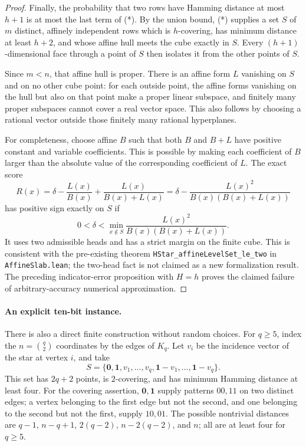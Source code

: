 \documentclass[11pt]{article}
\begin{document}
\begin{proof}
Finally, the probability that two rows have Hamming distance at
most $h+1$ is at most the last term of (*). By the union bound,
(*) supplies a set $S$ of $m$ distinct, affinely independent rows
which is $h$-covering, has minimum distance at least $h+2$, and
whose affine hull meets the cube exactly in $S$.
Every $(h+1)$-dimensional face through a point of $S$ then isolates
it from the other points of $S$.

Since $m<n$, that affine hull is proper. There is an affine form
$L$ vanishing on $S$ and on no other cube point: for each outside
point, the affine forms vanishing on the hull but also on that point
make a proper linear subspace, and finitely many proper subspaces
cannot cover a real vector space. This also follows by choosing a
rational vector outside those finitely many rational hyperplanes.

For completeness, choose affine $B$ such that both $B$ and $B+L$
have positive constant and variable coefficients. This is possible
by making each coefficient of $B$ larger than the absolute value
of the corresponding coefficient of $L$. The exact score
\[
 R(x)=\delta-\frac{L(x)}{B(x)}+\frac{L(x)}{B(x)+L(x)}
     =\delta-\frac{L(x)^2}{B(x)(B(x)+L(x))}
\]
has positive sign exactly on $S$ if
\[
 0<\delta<\min_{x\notin S}
 \frac{L(x)^2}{B(x)(B(x)+L(x))}.
\]
It uses two admissible heads and has a strict margin on the finite
cube. This is consistent with the pre-existing theorem
\texttt{HStar\_affineLevelSet\_le\_two} in
\texttt{AffineSlab.lean}; the two-head fact is not claimed as a new
formalization result. The preceding indicator-error proposition
with $H=h$ proves the claimed failure of arbitrary-accuracy
numerical approximation.
\end{proof}

\paragraph{An explicit ten-bit instance.}
There is also a direct finite construction without random choices.
For $q\ge5$, index the $n=\binom q2$ coordinates by the edges of
$K_q$. Let $v_i$ be the incidence vector of the star at vertex $i$,
and take
\[
 S=\{\mathbf0,\mathbf1,v_1,\ldots,v_q,
                         \mathbf1-v_1,\ldots,\mathbf1-v_q\}.
\]
This set has $2q+2$ points, is $2$-covering, and has minimum
Hamming distance at least four. For the covering assertion,
$\mathbf0,\mathbf1$ supply patterns $00,11$ on two distinct
edges; a vertex belonging to the first edge but not the second,
and one belonging to the second but not the first, supply $10,01$.
The possible nontrivial distances are
$q-1$, $n-q+1$, $2(q-2)$, $n-2(q-2)$, and $n$; all are at least
four for $q\ge5$.
\end{document}
